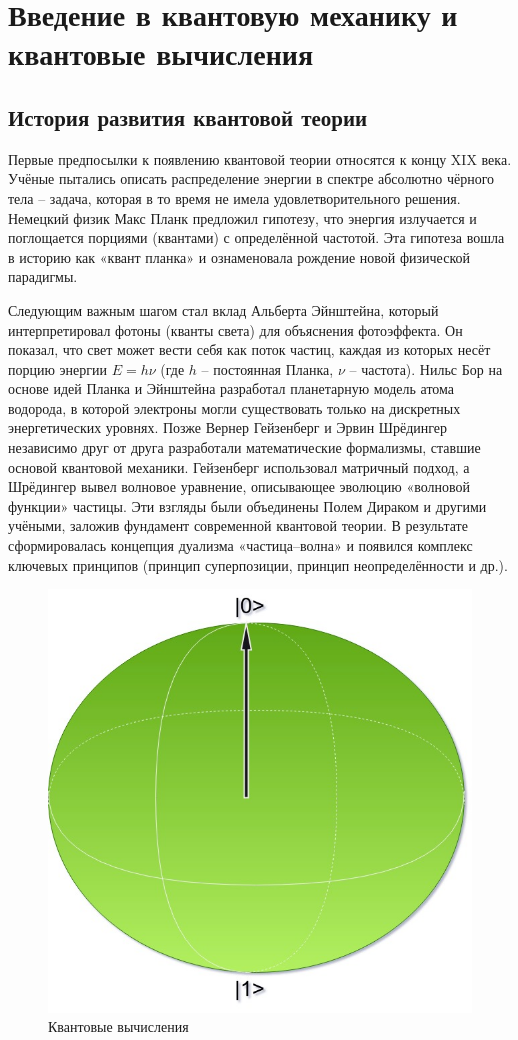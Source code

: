 \documentclass[a4paper,12pt]{article}
\begin{document}
\section{Введение в квантовую механику и квантовые вычисления}
\subsection{История развития квантовой теории}
Первые предпосылки к появлению квантовой теории относятся к концу XIX века. Учёные пытались описать распределение энергии в спектре абсолютно чёрного
тела – задача, которая в то время не имела удовлетворительного решения. Немецкий физик Макс Планк предложил гипотезу, что энергия излучается и поглощается
порциями (квантами) с определённой частотой. Эта гипотеза вошла в историю как «квант планка» и ознаменовала рождение новой физической парадигмы.

Следующим важным шагом стал вклад Альберта Эйнштейна, который интерпретировал фотоны (кванты света) для объяснения фотоэффекта.
Он показал, что свет может вести себя как поток частиц, каждая из которых несёт порцию энергии $E=h\nu$ (где $h$ – постоянная Планка, $\nu$ – частота).
Нильс Бор на основе идей Планка и Эйнштейна разработал планетарную модель атома водорода, в которой электроны могли существовать только на дискретных
энергетических уровнях. Позже Вернер Гейзенберг и Эрвин Шрёдингер независимо друг от друга разработали математические формализмы, ставшие основой квантовой
механики. Гейзенберг использовал матричный подход, а Шрёдингер вывел волновое уравнение, описывающее эволюцию «волновой функции» частицы. Эти взгляды были
объединены Полем Дираком и другими учёными, заложив фундамент современной квантовой теории. В результате сформировалась концепция дуализма «частица–волна»
и появился комплекс ключевых принципов (принцип суперпозиции, принцип неопределённости и др.).
\begin{figure}
	\centering
	\includegraphics[width=0.3\linewidth]{images/Bloch-Sphere.jpg}
	\caption{Квантовые вычисления}
	\label{fig:Bloch-Sphere}
\end{figure}
\end{document}

